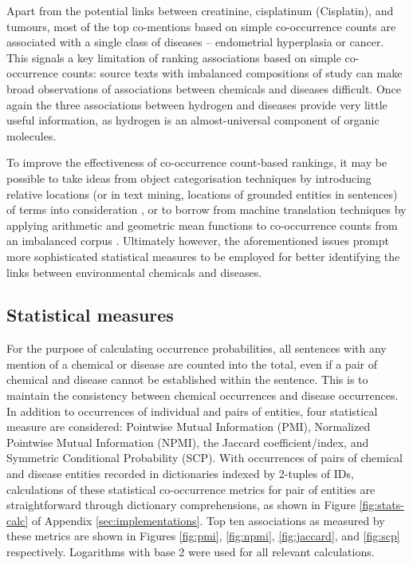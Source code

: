 \documentclass[10pt, oneside]{article}
\begin{document}
Apart from the potential links between creatinine, cisplatinum (Cisplatin), and tumours, most of the top co-mentions based on simple co-occurrence counts are associated with a single class of diseases -- endometrial hyperplasia or cancer. This signals a key limitation of ranking associations based on simple co-occurrence counts: source texts with imbalanced compositions of study can make broad observations of associations between chemicals and diseases difficult. Once again the three associations between hydrogen and diseases provide very little useful information, as hydrogen is an almost-universal component of organic molecules. 

To improve the effectiveness of co-occurrence count-based rankings, it may be possible to take ideas from object categorisation techniques by introducing relative locations (or in text mining, locations of grounded entities in sentences) of terms into consideration \cite{galleguillos2008object}, or to borrow from machine translation techniques by applying arithmetic and geometric mean functions to co-occurrence counts from an imbalanced corpus \cite{zhu2014improving}. Ultimately however, the aforementioned issues prompt more sophisticated statistical measures to be employed for better identifying the links between environmental chemicals and diseases.

\subsection{Statistical measures}

For the purpose of calculating occurrence probabilities, all sentences with any mention of a chemical or disease are counted into the total, even if a pair of chemical and disease cannot be established within the sentence. This is to maintain the consistency between chemical occurrences and disease occurrences. In addition to occurrences of individual and pairs of entities, four statistical measure are considered: Pointwise Mutual Information (PMI), Normalized Pointwise Mutual Information (NPMI), the Jaccard coefficient/index, and Symmetric Conditional Probability (SCP). With occurrences of pairs of chemical and disease entities recorded in dictionaries indexed by 2-tuples of IDs, calculations of these statistical co-occurrence metrics for pair of entities are straightforward through dictionary comprehensions, as shown in Figure \ref{fig:stats-calc} of Appendix \ref{sec:implementations}. Top ten associations as measured by these metrics are shown in Figures \ref{fig:pmi}, \ref{fig:npmi}, \ref{fig:jaccard}, and \ref{fig:scp} respectively. Logarithms with base 2 were used for all relevant calculations.
\end{document}
